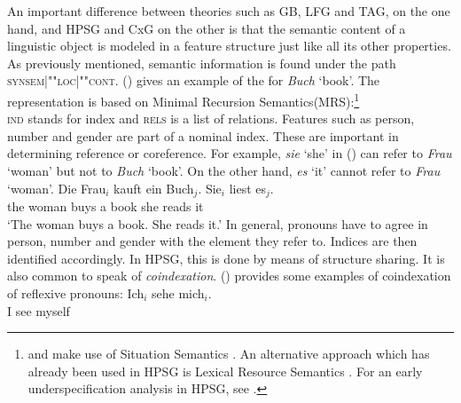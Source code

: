 An important difference between theories such as GB, LFG and TAG, on the one hand, and HPSG and CxG on the other is that the semantic content of a linguistic
object is modeled in a feature structure just like all its other properties. As previously mentioned, semantic information is found under the path
\textsc{synsem|""loc|""cont}. () gives an example of the \contv for \emph{Buch} `book'. The
representation is based on Minimal Recursion Semantics\indexmrs (MRS):\footnote{
   \citet{ps2} and \citet{GSag2000a-u} make use of Situation Semantics  \citep*{BP83a,CMP90,Devlin92}\nocite{BP87a}.
   An alternative approach which has already been used in HPSG is Lexical Resource Semantics \citep{RS2004a-u}.
   For an early underspecification analysis in HPSG, see .
}
\ea
\label{le-buch}
 \\
\z
\textsc{ind} stands for index and \textsc{rels} is a list of relations. Features such as person, number and
gender are part of a nominal index. These are important
in determining reference or coreference.
For example, \emph{sie} `she' in () can refer to \emph{Frau} `woman' but not to \emph{Buch} `book'. On the other hand, \emph{es} 
`it' cannot refer to \emph{Frau} `woman'.
\ea
\gll Die Frau$_i$ kauft ein Buch$_j$. Sie$_i$ liest es$_j$.\\
	 the woman buys a book she reads it\\
\glt `The woman buys a book. She reads it.'
\z
In general, pronouns have to agree in person, number and gender with the element they refer to. Indices are then identified accordingly.
In HPSG, this is done by means of structure sharing. It is also common to speak of \textit{coindexation}.
() provides some examples of coindexation of reflexive pronouns:
\eal
\ex
\gll Ich$_i$ sehe mich$_i$.\\
     I see myself\\
